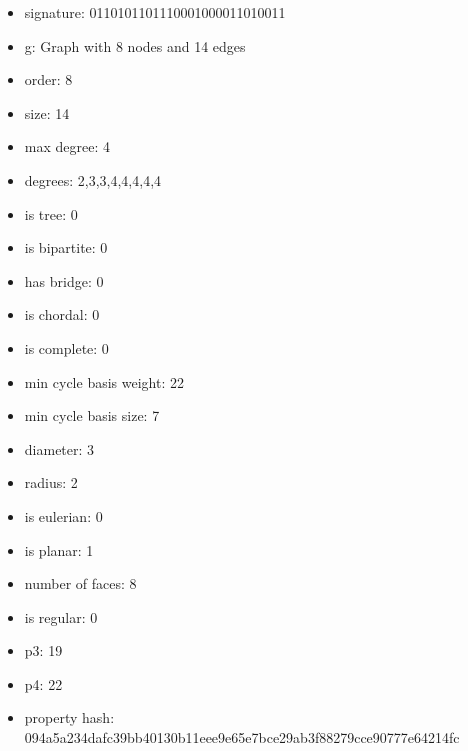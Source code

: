 \begin{itemize}
\item signature: 0110101101110001000011010011
\item g: Graph with 8 nodes and 14 edges
\item order: 8
\item size: 14
\item max degree: 4
\item degrees: 2,3,3,4,4,4,4,4
\item is tree: 0
\item is bipartite: 0
\item has bridge: 0
\item is chordal: 0
\item is complete: 0
\item min cycle basis weight: 22
\item min cycle basis size: 7
\item diameter: 3
\item radius: 2
\item is eulerian: 0
\item is planar: 1
\item number of faces: 8
\item is regular: 0
\item p3: 19
\item p4: 22
\item property hash: 094a5a234dafc39bb40130b11eee9e65e7bce29ab3f88279cce90777e64214fc
\end{itemize}
\newpage
\begin{figure}
\end{figure}
